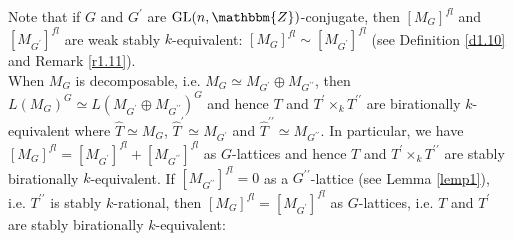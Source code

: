 \documentclass{amsart}
\theoremstyle{plain}
\theoremstyle{definition}
\theoremstyle{remark}
\newcommand{\bZ}{\mathbbm{Z}}\newcommand{\bQ}{\mathbbm{Q}}
\newcommand{\GL}{{\rm GL}}\newcommand{\SL}{{\rm SL}}
\begin{document}
Note that if $G$ and $G^\prime$ are $\GL(n,\bZ)$-conjugate, 
then $[M_G]^{fl}$ and $[M_{G^\prime}]^{fl}$ 
are weak stably $k$-equivalent: $[M_G]^{fl}\sim [M_{G^\prime}]^{fl}$ 
(see Definition \ref{d1.10} and Remark \ref{r1.11}).\\

When $M_G$ is decomposable, i.e. 
$M_G\simeq M_{G^\prime}\oplus M_{G^{\prime\prime}}$, 
then 
$L(M_G)^G\simeq L(M_{G^\prime}\oplus M_{G^{\prime\prime}})^G$ 
and hence $T$ and $T^\prime\times_k T^{\prime\prime}$ 
are birationally $k$-equivalent 
where $\widehat{T}\simeq M_G$, 
$\widehat{T}^\prime\simeq M_{G^\prime}$ and 
$\widehat{T}^{\prime\prime}\simeq M_{G^{\prime\prime}}$. 
In particular, we have 
$[M_G]^{fl}=[M_{G^\prime}]^{fl}+[M_{G^{\prime\prime}}]^{fl}$ 
as $G$-lattices and hence $T$ and $T^\prime\times_k T^{\prime\prime}$ 
are stably birationally $k$-equivalent. 
If $[M_{G^{\prime\prime}}]^{fl}=0$ as a $G^{\prime\prime}$-lattice 
(see Lemma \ref{lemp1}), i.e. 
$T^{\prime\prime}$ is stably $k$-rational, 
then $[M_G]^{fl}=[M_{G^\prime}]^{fl}$ as $G$-lattices, 
i.e. $T$ and $T^\prime$ are stably birationally $k$-equivalent: 
%
\end{document}
